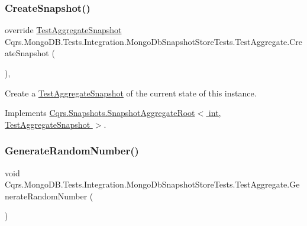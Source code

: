 \subsubsection{\texorpdfstring{Create\+Snapshot()}{CreateSnapshot()}}
{\footnotesize\ttfamily override \hyperlink{classCqrs_1_1MongoDB_1_1Tests_1_1Integration_1_1MongoDbSnapshotStoreTests_1_1TestAggregateSnapshot}{Test\+Aggregate\+Snapshot} Cqrs.\+Mongo\+D\+B.\+Tests.\+Integration.\+Mongo\+Db\+Snapshot\+Store\+Tests.\+Test\+Aggregate.\+Create\+Snapshot (\begin{DoxyParamCaption}{ }\end{DoxyParamCaption})\hspace{0.3cm}{\ttfamily [protected]}, {\ttfamily [virtual]}}



Create a \hyperlink{classCqrs_1_1MongoDB_1_1Tests_1_1Integration_1_1MongoDbSnapshotStoreTests_1_1TestAggregateSnapshot}{Test\+Aggregate\+Snapshot} of the current state of this instance. 



Implements \hyperlink{classCqrs_1_1Snapshots_1_1SnapshotAggregateRoot_a2d8cd57c7b6c2696d286c6dc5e9f0479_a2d8cd57c7b6c2696d286c6dc5e9f0479}{Cqrs.\+Snapshots.\+Snapshot\+Aggregate\+Root$<$ int, Test\+Aggregate\+Snapshot $>$}.

\mbox{\label{classCqrs_1_1MongoDB_1_1Tests_1_1Integration_1_1MongoDbSnapshotStoreTests_1_1TestAggregate_abf4cc55c292b34c8a507d80f14d544d3_abf4cc55c292b34c8a507d80f14d544d3}} 
\subsubsection{\texorpdfstring{Generate\+Random\+Number()}{GenerateRandomNumber()}}
{\footnotesize\ttfamily void Cqrs.\+Mongo\+D\+B.\+Tests.\+Integration.\+Mongo\+Db\+Snapshot\+Store\+Tests.\+Test\+Aggregate.\+Generate\+Random\+Number (\begin{DoxyParamCaption}{ }\end{DoxyParamCaption})}





